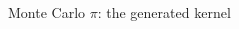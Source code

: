 \documentclass[@BEAMER_OPTIONS@]{beamer}
\begin{document}
\begin{frame}[fragile]{Monte Carlo $\pi$: the generated kernel}
    \begin{columns}
        \begin{column}[t]{0.2\textwidth}
            \begin{exampleblock}{}
                \begin{adjustbox}{width=0.30\textwidth, height=\textheight, keepaspectratio}
                    \begin{minipage}{\textwidth}
                        
                    \end{minipage}
                \end{adjustbox}
            \end{exampleblock}
        \end{column}
        \begin{column}[t]{0.2\textwidth}
            \begin{exampleblock}{}
                \begin{adjustbox}{width=0.30\textwidth, height=\textheight, keepaspectratio}
                    \begin{minipage}{\textwidth}
                        
                    \end{minipage}
                \end{adjustbox}
            \end{exampleblock}
        \end{column}
        \begin{column}[t]{0.2\textwidth}
            \begin{exampleblock}{}
                \begin{adjustbox}{width=0.30\textwidth, height=\textheight, keepaspectratio}
                    \begin{minipage}{\textwidth}
                        
                    \end{minipage}
                \end{adjustbox}
            \end{exampleblock}
        \end{column}
        \begin{column}[t]{0.3\textwidth}
            \begin{exampleblock}{}
                \begin{adjustbox}{width=0.30\textwidth, height=\textheight, keepaspectratio}
                    \begin{minipage}{\textwidth}
                        
                    \end{minipage}
                \end{adjustbox}
            \end{exampleblock}
        \end{column}
    \end{columns}
\end{frame}
\end{document}
